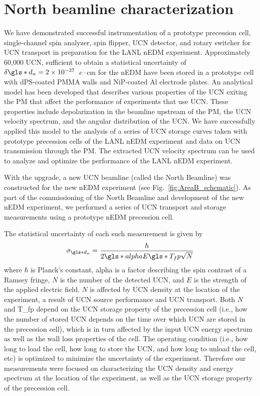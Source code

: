 
\chapter{North beamline characterization}
\label{chap:north_beamline_paper}


We have demonstrated successful instrumentation of a prototype precession cell, single-channel spin analyzer, spin flipper, UCN detector, and rotary switcher for UCN transport in preparation for the LANL nEDM experiment. Approximately 60,000 UCN, sufficient to obtain a statistical uncertainty of $\delta \gls*{d_n} = 2\times 10^{-27}$~$e\cdot\text{cm}$ for the nEDM have been stored in a prototype cell with dPS-coated PMMA walls and NiP-coated Al electrode plates. An analytical model has been developed that describes various properties of the UCN exiting the PM that affect the performance of experiments that use UCN. These properties include depolarization in the beamline upstream of the PM, the UCN velocity spectrum, and the angular distribution of the UCN. We have successfully applied this model to the analysis of a series of UCN storage curves taken with prototype precession cells of the LANL nEDM experiment and data on UCN transmission through the PM. The extracted UCN velocity spectrum can be used to analyze and optimize the performance of the LANL nEDM experiment. 

With the upgrade, a new UCN beamline (called the North Beamline) was constructed for the new nEDM experiment (see Fig.~\ref{fig:AreaB_schematic}). As part of the commissioning of the North Beamline and development of the new nEDM experiment, we performed a series of UCN transport and storage measurements using a prototype nEDM precession cell. 

 The statistical uncertainty of each such measurement is given by 
%
\begin{gather*}
    \sigma_{\gls*{d_n}} = \frac{\hbar}{2\gls*{alpha} E \gls*{T_fp} \sqrt{N}}
\end{gather*}
%
where $\hbar$ is Planck’s constant, \gls*{alpha} is a factor describing the spin contrast of a Ramsey fringe, $N$ is the number of the detected UCN, and $E$ is the strength of the applied electric field. $N$ is affected by UCN density at the location of the experiment, a result of UCN source performance and UCN transport. Both $N$ and \gls*{T_fp} depend on the UCN storage property of the precession cell (i.e., how the number of stored UCN depends on the time over which UCN are stored in the precession cell), which is in turn affected by the input UCN energy spectrum as well as the wall loss properties of the cell. The operating condition (i.e., how long to load the cell, how long to store the UCN, and how long to unload the cell, etc) is optimized to minimize the uncertainty of the experiment. Therefore our measurements were focused on characterizing the UCN density and energy spectrum at the location of the experiment, as well as the UCN storage property of the precession cell. 

